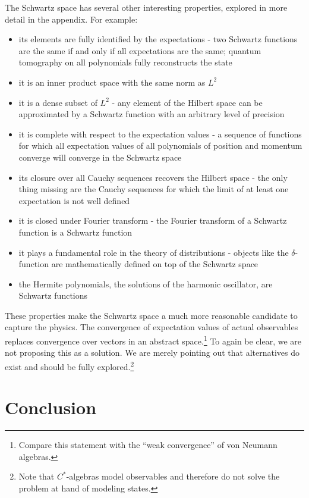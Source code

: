 \documentclass[10pt,twocolumn, nofootinbib]{revtex4-2}
\begin{document}
The Schwartz space has several other interesting properties,\cite{moretti_spectral_2017, reed_methods_1980, hall_quantum_2013, rauch_solution_1991} explored in more detail in the appendix. For example:

\begin{itemize}
\item its elements are fully identified by the expectations - two Schwartz functions are the same if and only if all expectations are the same; quantum tomography on all polynomials fully reconstructs the state
\item it is an inner product space with the same norm as $L^2$
\item it is a dense subset of $L^2$ - any element of the Hilbert space can be approximated by a Schwartz function with an arbitrary level of precision
\item it is complete with respect to the expectation values - a sequence of functions for which all expectation values of all polynomials of position and momentum converge will converge in the Schwartz space
\item its closure over all Cauchy sequences recovers the Hilbert space - the only thing missing are the Cauchy sequences for which the limit of at least one expectation is not well defined
\item it is closed under Fourier transform - the Fourier transform of a Schwartz function is a Schwartz function
\item it plays a fundamental role in the theory of distributions - objects like the $\delta$-function are mathematically defined on top of the Schwartz space
\item the Hermite polynomials, the solutions of the harmonic oscillator, are Schwartz functions
\end{itemize}
These properties make the Schwartz space a much more reasonable candidate to capture the physics.\cite{albert2022bosonic} The convergence of expectation values of actual observables replaces convergence over vectors in an abstract space.\footnote{Compare this statement with the ``weak convergence'' of von Neumann algebras.} To again be clear, we are not proposing this as a solution. We are merely pointing out that alternatives do exist and should be fully explored.\footnote{Note that $C^*$-algebras model observables and therefore do not solve the problem at hand of modeling states.}

\section{Conclusion}
\end{document}
